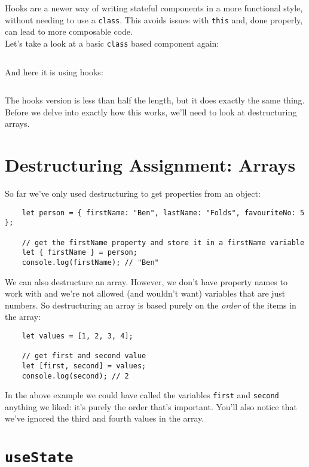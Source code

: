 Hooks are a newer way of writing stateful components in a more functional style, without needing to use a \texttt{class}. This avoids issues with \texttt{this} and, done properly, can lead to more composable code.
\\

Let's take a look at a basic \texttt{class} based component again:

\inputminted{js}{04-hooks/figures/01-class-component.js}

And here it is using hooks:

\inputminted{js}{04-hooks/figures/02-hooks.js}

The hooks version is less than half the length, but it does exactly the same thing.
\\

Before we delve into exactly how this works, we'll need to look at destructuring arrays.

\section{Destructuring Assignment: Arrays}
So far we've only used destructuring to get properties from an object:

\begin{verbatim}
    let person = { firstName: "Ben", lastName: "Folds", favouriteNo: 5 };

    // get the firstName property and store it in a firstName variable
    let { firstName } = person;
    console.log(firstName); // "Ben"
\end{verbatim}

We can also destructure an array. However, we don't have property names to work with and we're not allowed (and wouldn't want) variables that are just numbers. So destructuring an array is based purely on the \textit{order} of the items in the array:

\begin{verbatim}
    let values = [1, 2, 3, 4];

    // get first and second value
    let [first, second] = values;
    console.log(second); // 2
\end{verbatim}

In the above example we could have called the variables \texttt{first} and \texttt{second} anything we liked: it's purely the order that's important. You'll also notice that we've ignored the third and fourth values in the array.


\section{\texttt{useState}}

